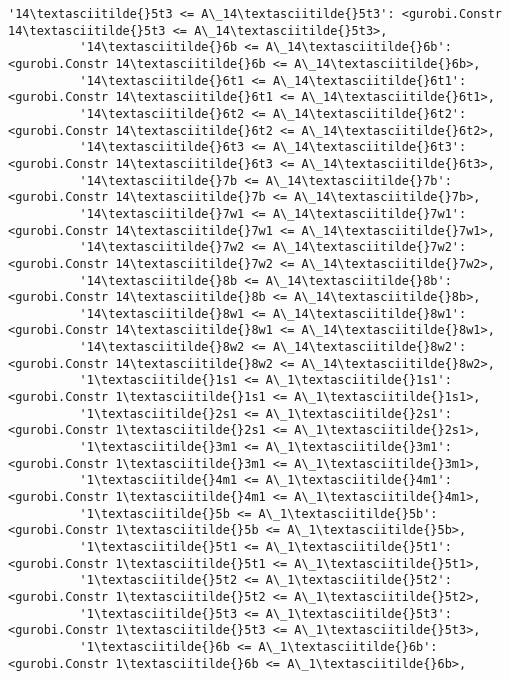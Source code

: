 \documentclass[11pt]{article}
\begin{document}
\begin{Verbatim}[commandchars=\\\{\}]
          '14\textasciitilde{}5t3 <= A\_14\textasciitilde{}5t3': <gurobi.Constr 14\textasciitilde{}5t3 <= A\_14\textasciitilde{}5t3>,
          '14\textasciitilde{}6b <= A\_14\textasciitilde{}6b': <gurobi.Constr 14\textasciitilde{}6b <= A\_14\textasciitilde{}6b>,
          '14\textasciitilde{}6t1 <= A\_14\textasciitilde{}6t1': <gurobi.Constr 14\textasciitilde{}6t1 <= A\_14\textasciitilde{}6t1>,
          '14\textasciitilde{}6t2 <= A\_14\textasciitilde{}6t2': <gurobi.Constr 14\textasciitilde{}6t2 <= A\_14\textasciitilde{}6t2>,
          '14\textasciitilde{}6t3 <= A\_14\textasciitilde{}6t3': <gurobi.Constr 14\textasciitilde{}6t3 <= A\_14\textasciitilde{}6t3>,
          '14\textasciitilde{}7b <= A\_14\textasciitilde{}7b': <gurobi.Constr 14\textasciitilde{}7b <= A\_14\textasciitilde{}7b>,
          '14\textasciitilde{}7w1 <= A\_14\textasciitilde{}7w1': <gurobi.Constr 14\textasciitilde{}7w1 <= A\_14\textasciitilde{}7w1>,
          '14\textasciitilde{}7w2 <= A\_14\textasciitilde{}7w2': <gurobi.Constr 14\textasciitilde{}7w2 <= A\_14\textasciitilde{}7w2>,
          '14\textasciitilde{}8b <= A\_14\textasciitilde{}8b': <gurobi.Constr 14\textasciitilde{}8b <= A\_14\textasciitilde{}8b>,
          '14\textasciitilde{}8w1 <= A\_14\textasciitilde{}8w1': <gurobi.Constr 14\textasciitilde{}8w1 <= A\_14\textasciitilde{}8w1>,
          '14\textasciitilde{}8w2 <= A\_14\textasciitilde{}8w2': <gurobi.Constr 14\textasciitilde{}8w2 <= A\_14\textasciitilde{}8w2>,
          '1\textasciitilde{}1s1 <= A\_1\textasciitilde{}1s1': <gurobi.Constr 1\textasciitilde{}1s1 <= A\_1\textasciitilde{}1s1>,
          '1\textasciitilde{}2s1 <= A\_1\textasciitilde{}2s1': <gurobi.Constr 1\textasciitilde{}2s1 <= A\_1\textasciitilde{}2s1>,
          '1\textasciitilde{}3m1 <= A\_1\textasciitilde{}3m1': <gurobi.Constr 1\textasciitilde{}3m1 <= A\_1\textasciitilde{}3m1>,
          '1\textasciitilde{}4m1 <= A\_1\textasciitilde{}4m1': <gurobi.Constr 1\textasciitilde{}4m1 <= A\_1\textasciitilde{}4m1>,
          '1\textasciitilde{}5b <= A\_1\textasciitilde{}5b': <gurobi.Constr 1\textasciitilde{}5b <= A\_1\textasciitilde{}5b>,
          '1\textasciitilde{}5t1 <= A\_1\textasciitilde{}5t1': <gurobi.Constr 1\textasciitilde{}5t1 <= A\_1\textasciitilde{}5t1>,
          '1\textasciitilde{}5t2 <= A\_1\textasciitilde{}5t2': <gurobi.Constr 1\textasciitilde{}5t2 <= A\_1\textasciitilde{}5t2>,
          '1\textasciitilde{}5t3 <= A\_1\textasciitilde{}5t3': <gurobi.Constr 1\textasciitilde{}5t3 <= A\_1\textasciitilde{}5t3>,
          '1\textasciitilde{}6b <= A\_1\textasciitilde{}6b': <gurobi.Constr 1\textasciitilde{}6b <= A\_1\textasciitilde{}6b>,

\end{Verbatim}
\end{document}
